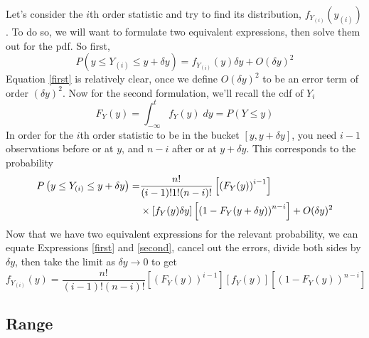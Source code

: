 \documentclass[a4paper,12pt]{scrartcl}
\begin{document}
Let's consider the $i$th order statistic and try to find its
distribution, $f_{Y_{(i)}}\left(y_{(i)}\right)$. To do so, we will
want to formulate two equivalent expressions, then solve them out for
the pdf. So first,
\begin{equation}
   \label{first}
   P\left(y \leq Y_{(i)} \leq y + \delta y\right) =
      f_{Y_{(i)}}\left(y\right)\delta y + O(\delta y)^2
\end{equation}
Equation \ref{first} is relatively clear, once we define $O(\delta y)^2$
to be an error term of order $(\delta y)^2$.  Now for the second
formulation, we'll recall the cdf of $Y_i$
\begin{equation}
   F_Y(y) = \int^t_{-\infty} f_Y(y) \; dy = P(Y \leq y)
\end{equation}
In order for the $i$th order statistic to be in the bucket
$[y, y+\delta y]$, you need $i-1$ observations before or at $y$,
and $n-i$ after or at $y+ \delta y$. This corresponds to the
probability
\begin{align}
      \label{second}
      P\left(y \leq Y_{(i)} \leq y + \delta y\right) =
      &\frac{n!}{(i-1)!1!(n-i)!}\left[\left(F_Y(y)\right)^{i-1}\right]
      \notag\\
      &\times\left[f_Y(y)\delta y\right]
      \left[\left(1 - F_Y(y + \delta y)\right)^{n-i}\right] +
      O(\delta y)^2
\end{align}
Now that we have two equivalent expressions for the relevant probability,
we can equate Expressions \ref{first} and \ref{second}, cancel out the
errors, divide both sides by $\delta y$, then take the limit as
$\delta y \rightarrow 0$ to get
\begin{equation}
   \label{orderpdf}
   f_{Y_{(i)}}\left(y\right) = \frac{n!}{(i-1)!(n-i)!}
   \left[\left(F_Y(y)\right)^{i-1}\right]
   \left[f_Y(y)\right]
   \left[\left(1 - F_Y(y)\right)^{n-i}\right]
\end{equation}

\subsection{Range}
\end{document}
